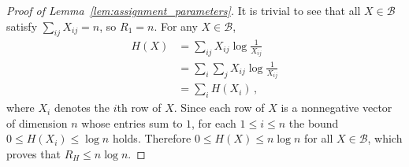 \documentclass[final,12pt]{colt2018}
\newcommand{\cB}{\mathcal{B}}
\newcommand{\1}{\mathds{1}}
\newcommand*{\ent}[1]{H(#1)}
\begin{document}
\begin{proof}[Proof of Lemma~\ref{lem:assignment_parameters}]
It is trivial to see that all $X \in \cB$ satisfy $\sum_{ij} X_{ij} = n$, so $R_1 = n$.
For any $X \in \cB$,
\begin{align*}
\ent{X} & = \sum_{ij} X_{ij} \log \frac{1}{X_{ij}} \\
& = \sum_i \sum_j X_{ij} \log \frac{1}{X_{ij}} \\
& = \sum_i \ent{X_i}\,,
\end{align*}
where $X_i$ denotes the $i$th row of $X$.
Since each row of $X$ is a nonnegative vector of dimension $n$ whose entries sum to $1$, for each $1 \leq i \leq n$ the bound $0 \leq H(X_i) \leq \log n$ holds.
Therefore $0 \leq \ent{X} \leq n \log n$ for all $X \in \cB$, which proves that $R_H \leq n \log n$.
\end{proof}



\end{document}
